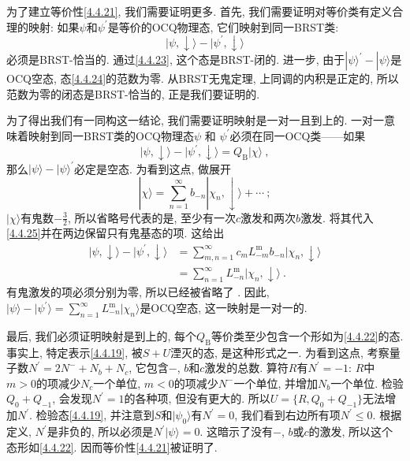 为了建立等价性\eqref{4.4.21}, 我们需要证明更多. 首先, 我们需要证明对等价类有定义合理的映射: 如果$\psi$和$\psi^{\prime}$是等价的OCQ物理态, 它们映射到同一BRST类:
\begin{equation}
|\psi, \downarrow\rangle- |\psi^{\prime}, \downarrow\rangle  \label{4.4.24}
\end{equation}
必须是BRST-恰当的. 通过\eqref{4.4.23}, 这个态是BRST-闭的. 进一步, 由于$|\psi\rangle^{\prime}-|\psi\rangle$是OCQ空态, 态\eqref{4.4.24}的范数为零. 
从BRST无鬼定理, 上同调的内积是正定的, 所以范数为零的闭态是BRST-恰当的, 正是我们要证明的.

为了得出我们有一同构这一结论, 我们需要证明映射是一对一且到上的. 一对一意味着映射到同一BRST类的OCQ物理态$\psi$ 和 $\psi^{\prime}$必须在同一OCQ类——如果
\begin{equation}
|\psi, \downarrow\rangle- |\psi^{\prime}, \downarrow \rangle=Q_{\mathrm{B}}|\chi\rangle \:, \label{4.4.25}
\end{equation}
那么$|\psi\rangle-|\psi\rangle^{\prime}$必定是空态. 为看到这点, 做展开
\begin{equation}
|\chi\rangle=\sum_{n=1}^{\infty} b_{-n}|\chi_{n}, \downarrow\rangle+\cdots \:;\label{4.4.26}
\end{equation}
$|\chi\rangle$有鬼数$-\frac{3}{2}$, 所以省略号代表的是, 至少有一次$c$激发和两次$b$激发. 将其代入\eqref{4.4.25}并在两边保留只有鬼基态的项. 这给出
\begin{align}
|\psi, \downarrow\rangle- |\psi^{\prime}, \downarrow\rangle &=\sum_{m, n=1}^{\infty} c_{m} L_{-m}^{\mathrm{m}} b_{-n}|\chi_{n}, \downarrow\rangle \nonumber \\
&=\sum_{n=1}^{\infty} L_{-n}^{\mathrm{m}}|\chi_{n}, \downarrow\rangle \:. \label{4.4.27}
\end{align}
有鬼激发的项必须分别为零, 所以已经被省略了 . 因此, $|\psi\rangle-|\psi^{\prime}\rangle=\sum_{n=1}^{\infty} L_{-n}^{\mathrm{m}}|\chi_{n}\rangle$是OCQ空态, 这一映射是一对一的. 

最后, 我们必须证明映射是到上的, 每个$Q_{\mathrm{B}}$等价类至少包含一个形如为\eqref{4.4.22}的态. 事实上, 特定表示\eqref{4.4.19}, 被$S+U$湮灭的态, 是这种形式之一. 为看到这点, 考察量子数$N^{\prime}=2 N^{-}+N_{b}+N_{c}$, 它包含$-$, $b$和$c$激发的总数. 算符$R$有$N^{\prime}=-1$:  $R$中$m>0$的项减少$N_{c}$一个单位, 
$m<0$的项减少$N^{-}$一个单位, 并增加$N_{b}$一个单位. 检验$Q_{0}+Q_{-1}$, 会发现$N^{\prime}=1$的各种项, 但没有更大的. 
所以$U=\{R, Q_{0}+Q_{-1}\}$无法增加$N^{\prime}$. 检验态\eqref{4.4.19}, 并注意到$S$和$|\psi_{0}\rangle$有$N^{\prime}=0$, 
我们看到右边所有项$N^{\prime} \leq 0 $. 根据定义, $N^{\prime}$是非负的, 所以必须是$N^{\prime}|\psi\rangle=0 $.  这暗示了没有$-$, $b$或$c$的激发, 
所以这个态形如\eqref{4.4.22}. 因而等价性\eqref{4.4.21}被证明了.

